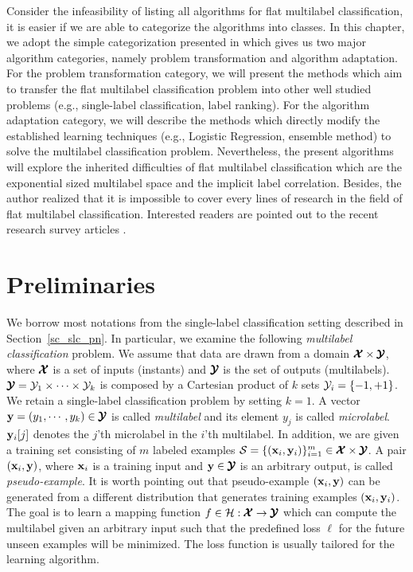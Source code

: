 {Consider the infeasibility of listing all algorithms for flat multilabel classification, it is easier if we are able to categorize the algorithms into classes.
In this chapter, we adopt the simple categorization presented in \citep{Tsoumakas07multi,Tsoumakas10mining} which gives us two major algorithm categories, namely problem transformation and algorithm adaptation.
For the problem transformation category, we will present the methods which aim to transfer the flat multilabel classification problem into other well studied problems (e.g., single-label classification, label ranking).
For the algorithm adaptation category, we will describe the methods which directly modify the established learning techniques (e.g., Logistic Regression, ensemble method) to solve the multilabel classification problem.
Nevertheless, the present algorithms will explore the inherited difficulties of flat multilabel classification which are the exponential sized multilabel space and the implicit label correlation.
Besides, the author realized that it is impossible to cover every lines of research in the field of flat multilabel classification.
Interested readers are pointed out to the recent research survey articles \citep{Tsoumakas07multi,Tsoumakas10mining,Zhang14a}.



\section{Preliminaries} \label{sc_mlc_pn}

We borrow most notations from the single-label classification setting described in Section~\ref{sc_slc_pn}.
In particular, we examine the following \textit{multilabel classification} problem.
We assume that data are drawn from a domain $\pmb {\mathcal{X}}\times\pmb {\mathcal{Y}}$, where $\pmb {\mathcal{X}}$ is a set of inputs (instants) and $\pmb {\mathcal{Y}}$ is the set of outputs (multilabels).
$\pmb {\mathcal{Y}} = \mathcal{Y}_1\times\cdots\times\mathcal{Y}_k$ is composed by a Cartesian product of $k$ sets $\mathcal{Y}_i=\{-1,+1\}$.
We retain a single-label classification problem by setting $k=1$.
A vector $\mathbf {y}=(y_1,\cdots,y_k)\in\pmb {\mathcal{Y}}$ is called \textit{multilabel} and its element $y_j$ is called \textit{microlabel}.
$\mathbf {y}_i[j]$ denotes the $j$'th microlabel in the $i$'th multilabel.
In addition, we are given a training set consisting of $m$ labeled examples $\mathcal{S}=\{(\mathbf {x}_i,\mathbf {y}_i)\}_{i=1}^{m}\in\pmb {\mathcal{X}}\times\pmb {\mathcal{Y}}$. 
A pair $(\mathbf {x}_i,\mathbf {y})$, where $\mathbf {x}_i$ is a training input and $\mathbf {y}\in\pmb {\mathcal{Y}}$ is an arbitrary output, is called \textit{pseudo-example}.
It is worth pointing out that pseudo-example $(\mathbf {x}_i,\mathbf {y})$ can be generated from a different distribution that generates training examples $(\mathbf {x}_i,\mathbf {y}_i)$.
The goal is to learn a mapping function $f\in\mathcal{H}:\pmb {\mathcal{X}}\rightarrow\pmb {\mathcal{Y}}$ which can compute the multilabel given an arbitrary input such that the predefined loss $\ell$ for the future unseen examples will be minimized.
The loss function is usually tailored for the learning algorithm.



}
